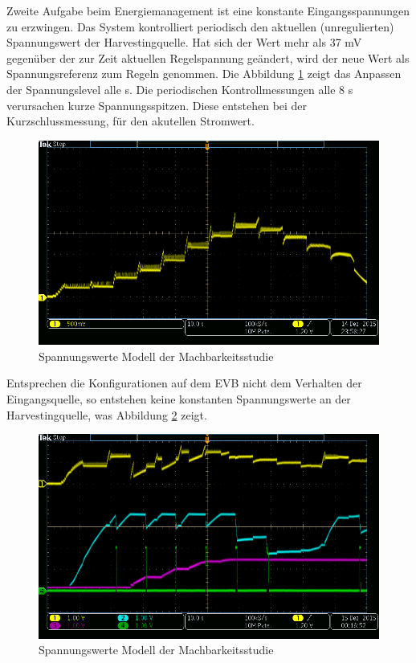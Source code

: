 Zweite Aufgabe beim Energiemanagement ist eine konstante Eingangsspannungen zu erzwingen. Das System kontrolliert periodisch den aktuellen (unregulierten) Spannungswert der Harvestingquelle. Hat sich der Wert mehr als 37 mV gegenüber der zur Zeit aktuellen Regelspannung geändert, wird der neue Wert als Spannungsreferenz zum Regeln genommen. Die Abbildung \ref{RegelungSpannung} zeigt das Anpassen der Spannungslevel alle s. Die periodischen Kontrollmessungen alle 8 s verursachen kurze Spannungsspitzen. Diese entstehen bei der Kurzschlussmessung, für den akutellen Stromwert.


\begin{figure}    
    \includegraphics[scale = 0.3]{2TheoretischeGrundlagen/imag/RegelungVHRV.png}
    \caption{Spannungswerte Modell der Machbarkeitsstudie}\label{RegelungSpannung} 
\end{figure}

Entsprechen die Konfigurationen auf dem EVB nicht dem Verhalten der Eingangsquelle, so entstehen keine konstanten Spannungswerte an der Harvestingquelle, was Abbildung \ref{falscheRegelung} zeigt.

\begin{figure}
    \includegraphics[scale = 0.3]{2TheoretischeGrundlagen/imag/falscheRegelung.png}
    \caption{Spannungswerte Modell der Machbarkeitsstudie}\label{falscheRegelung} 
\end{figure}

